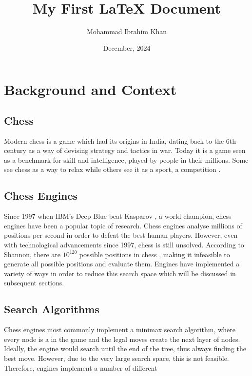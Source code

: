 \documentclass{article}
\title{My First LaTeX Document}
\author{Mohammad Ibrahim Khan}
\date{December, 2024}
\begin{document}
\maketitle

\tableofcontents
\listoffigures
\listoftables

\section{Background and Context}
\label{sec:background}

\subsection{Chess}
\label{sec:chess}
Modern chess is a game which had its origins in India, dating back to the 6th century \cite{davidsonShortHistoryChess2012}
as a way of devising strategy and tactics in war. Today it is a game seen as a benchmark for skill and 
intelligence, played by people in their millions. Some see chess as a way to relax while others 
see it as a sport, a competition \cite{averbakhHistoryChessChaturanga2012}.

\subsection{Chess Engines}
\label{sec:engines}
Since 1997 when IBM's Deep Blue beat Kasparov \cite{hsuIBMsDeepBlue1999}, a world champion, chess engines have been a 
popular topic of research. Chess engines analyse millions of positions per second in order to defeat
the best human players. However, even with technological advancements since 1997, chess is still
unsolved. According to Shannon, there are $10^{120}$ possible positions in chess \cite{shannonXXIIProgrammingComputer1950},
making it infeasible to generate all possible positions and evaluate them. Engines have
implemented a variety of ways in order to reduce this search space which will be discussed in subsequent
sections.

\subsection{Search Algorithms}
\label{sec:search}
Chess engines most commonly implement a minimax search algorithm, where every node is a 
in the game and the legal moves create the next layer of nodes. Ideally, the engine would search
until the end of the tree, thus always finding the best move. However, due to the very large search space,
this is not feasible. Therefore, engines implement a number of different
\end{document}
